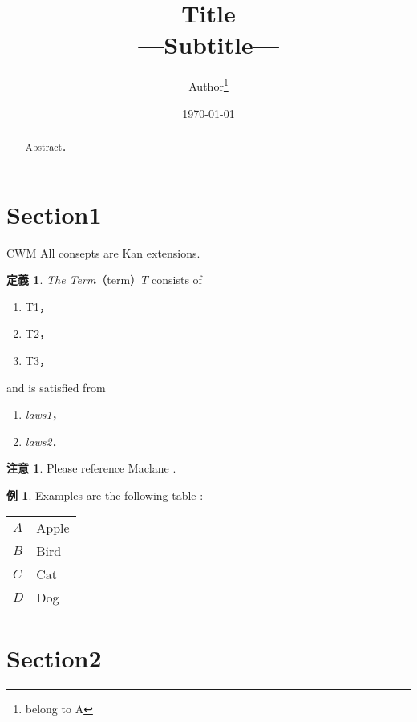 \documentclass[14pt]{ltjsarticle}
\title{
  Title
    \large{\\---Subtitle---}
}
\author{Author\footnote{belong to A} }
\date{\today}
\theoremstyle{definition}
\newtheorem{dfn}[thm]{定義}
\newtheorem{cf}[thm]{例}
\newtheorem{rem}[thm]{注意}
\numberwithin{thm}{section}
\begin{document}
\maketitle
\thispagestyle{plain}%

\begin{abstract}
  Abstract．
\end{abstract}

\newpage
\section{Section1}

\begin{itembox}[l]{CWM}
  All consepts are Kan extensions.
\end{itembox}

\begin{dfn}
  \emph{The Term}（term）$T$ consists of
  \begin{enumerate}
    \item T1，
    \item T2，
    \item T3，
  \end{enumerate}
  and is satisfied from
  \begin{enumerate}[resume]
    \item \emph{laws1}，
    \item \emph{laws2}．
  \end{enumerate}
\end{dfn}

\begin{rem}
  Please reference Maclane \cite{マックレーン}.
\end{rem}

\begin{cf}
  Examples are the following table :
  \begin{flushleft}
    \begin{tabular}{ll}
      $A$ &
      Apple \\
      $B$ &
      Bird  \\
      $C$ &
      Cat   \\
      $D$ &
      Dog
    \end{tabular}
  \end{flushleft}
\end{cf}

\section{Section2}
\end{document}
